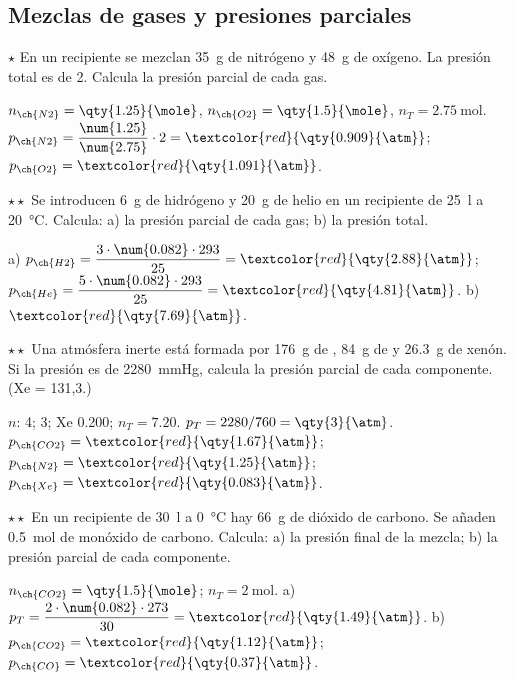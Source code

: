 \subsection{Mezclas de gases y presiones parciales}

\begin{exercise}
    \(\star\) En un recipiente se mezclan \qty{35}{\gram} de nitrógeno y \qty{48}{\gram} de oxígeno. La presión total es de \qty{2}{\atm}.
    Calcula la presión parcial de cada gas.
    \begin{solu}
        \(n_{\ch{N2}} = \qty{1.25}{\mole}\), \(n_{\ch{O2}} = \qty{1.5}{\mole}\), \(n_T = \qty{2.75}{\mole}\).
        \(p_{\ch{N2}} = \dfrac{\num{1.25}}{\num{2.75}} \cdot 2 = \textcolor{red}{\qty{0.909}{\atm}}\); \(p_{\ch{O2}} = \textcolor{red}{\qty{1.091}{\atm}}\).
    \end{solu}
\end{exercise}

\begin{exercise}
    \(\star\star\) Se introducen \qty{6}{\gram} de hidrógeno y \qty{20}{\gram} de helio en un recipiente de \qty{25}{\litre} a
    \qty{20}{\degreeCelsius}. Calcula: a) la presión parcial de cada gas; b) la presión total.
    \begin{solu}
        a) \(p_{\ch{H2}} = \dfrac{3 \cdot \num{0.082} \cdot 293}{25} = \textcolor{red}{\qty{2.88}{\atm}}\); \(p_{\ch{He}} = \dfrac{5 \cdot \num{0.082} \cdot 293}{25} =
        \textcolor{red}{\qty{4.81}{\atm}}\). b) \(\textcolor{red}{\qty{7.69}{\atm}}\).
    \end{solu}
\end{exercise}

\begin{exercise}
    \(\star\star\) Una atmósfera inerte está formada por \qty{176}{\gram} de , \qty{84}{\gram} de  y \qty{26.3}{\gram} de xenón. Si
    la presión es de \qty{2280}{\mmHg}, calcula la presión parcial de cada componente. (Xe = 131,3.)
    \begin{solu}
        \(n\):  4;  3; Xe \num{0.200}; \(n_T = \num{7.20}\). \(p_T = 2280/760 = \qty{3}{\atm}\).
        \(p_{\ch{CO2}} = \textcolor{red}{\qty{1.67}{\atm}}\); \(p_{\ch{N2}} = \textcolor{red}{\qty{1.25}{\atm}}\); \(p_{\ch{Xe}} = \textcolor{red}{\qty{0.083}{\atm}}\).
    \end{solu}
\end{exercise}

\begin{exercise}
    \(\star\star\) En un recipiente de \qty{30}{\litre} a \qty{0}{\degreeCelsius} hay \qty{66}{\gram} de dióxido de carbono. Se añaden
    \qty{0.5}{\mole} de monóxido de carbono. Calcula: a) la presión final de la mezcla; b) la presión parcial de cada componente.
    \begin{solu}
        \(n_{\ch{CO2}} = \qty{1.5}{\mole}\); \(n_T = \qty{2}{\mole}\).
        a) \(p_T = \dfrac{2 \cdot \num{0.082} \cdot 273}{30} = \textcolor{red}{\qty{1.49}{\atm}}\).
        b) \(p_{\ch{CO2}} = \textcolor{red}{\qty{1.12}{\atm}}\); \(p_{\ch{CO}} = \textcolor{red}{\qty{0.37}{\atm}}\).
    \end{solu}
\end{exercise}

